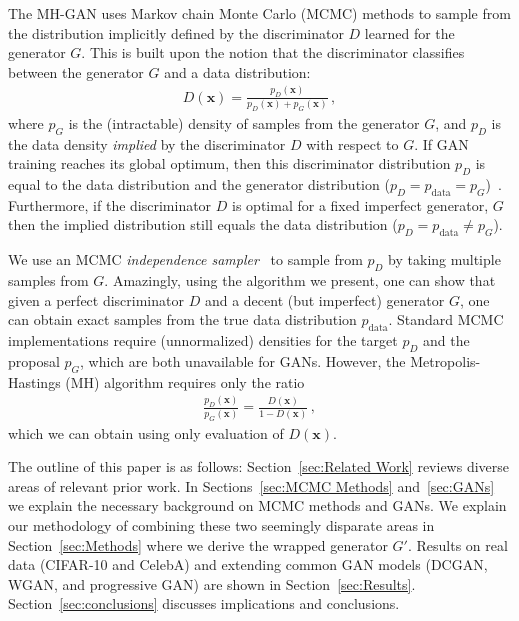 \documentclass{article}
\renewcommand{\vec}[1]{{\boldsymbol{\mathbf{#1}}}} %
\newcommand{\PG}{{p_G}}
\newcommand{\PD}{{p_D}}
\newcommand{\PR}{{p_{\textrm{data}}}}
\begin{document}
The MH-GAN uses Markov chain Monte Carlo (MCMC) methods to sample from the distribution implicitly defined by the discriminator $D$ learned for the generator $G$.
This is built upon the notion that the discriminator classifies between the generator $G$ and a data distribution:
\begin{align}
  D(\vec x) = \frac{\PD(\vec x)}{\PD(\vec x) + \PG(\vec x)} \,, \label{eq:define PD}
\end{align}
where $\PG$ is the (intractable) density of samples from the generator $G$, and $\PD$ is the data density \emph{implied} by the discriminator $D$ with respect to $G$.
If GAN training reaches its global optimum, then this discriminator distribution $\PD$ is equal to the data distribution and the generator distribution ($\PD = \PR = \PG$)~\citep{Goodfellow2014}.
Furthermore, if the discriminator $D$ is optimal for a fixed imperfect generator, $G$ then the implied distribution still equals the data distribution ($\PD = \PR \neq \PG$)\@.



We use an MCMC \emph{independence sampler}~\citep{Tierney1994} to sample from $\PD$ by taking multiple samples from $G$\@.
Amazingly, using the algorithm we present, one can show that given a perfect discriminator $D$ and a decent (but imperfect) generator $G$, one can obtain exact samples from the true data distribution $\PR$.
Standard MCMC implementations require (unnormalized) densities for the target $\PD$ and the proposal $\PG$, which are both unavailable for GANs.
However, the Metropolis-Hastings (MH) algorithm requires only the ratio
\begin{align}
  \frac{\PD(\vec x)}{\PG(\vec x)} = \frac{D(\vec x)}{1 - D(\vec x)}\,, \label{eq:PD inv}
\end{align}
which we can obtain using only evaluation of $D(\vec x)$.


The outline of this paper is as follows:
Section~\ref{sec:Related Work} reviews diverse areas of relevant prior work.
In Sections~\ref{sec:MCMC Methods} and~\ref{sec:GANs} we explain the necessary background on MCMC methods and GANs.
We explain our methodology of combining these two seemingly disparate areas in Section~\ref{sec:Methods} where we derive the wrapped generator $G'$.
Results on real data (CIFAR-10 and CelebA) and extending common GAN models (DCGAN, WGAN, and progressive GAN) are shown in Section~\ref{sec:Results}.
Section~\ref{sec:conclusions} discusses implications and conclusions.
\end{document}
